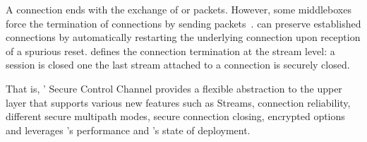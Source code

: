 A \tcp connection ends with the exchange of \fin or \rst packets. However, some
middleboxes force the termination of \tcp connections by sending \rst
packets~\cite{rfc3360,weaver2009detecting}. \tcpls can preserve established
connections by automatically restarting the underlying \tcp connection upon
reception of a spurious reset. \tcpls defines the connection termination at the
stream level: a \tcpls session is closed one the last stream attached to a
\tcp connection is securely closed.

That is, \tcpls' Secure Control Channel provides a flexible abstraction
to the upper layer that supports various new features such as
Streams, connection reliability, different secure multipath modes, secure
connection closing,  encrypted \tcp options and leverages \tcp's performance and \tls's state of deployment.


